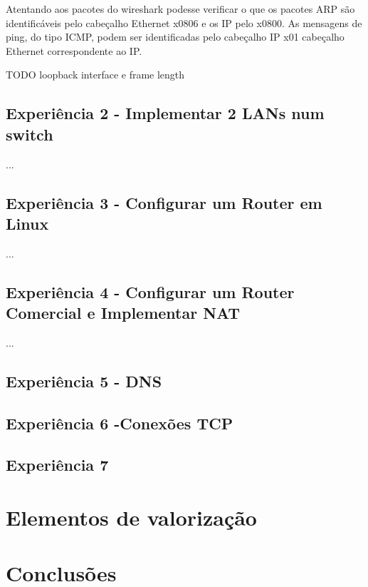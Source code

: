 \documentclass[11pt,a4paper,reqno]{report}
\numberwithin{equation}{section}
\begin{document}
Atentando aos pacotes do wireshark podesse verificar o que os pacotes ARP são identificáveis pelo cabeçalho Ethernet x0806 e os IP pelo x0800. As mensagens de ping, do tipo ICMP, podem ser identificadas pelo cabeçalho IP x01 cabeçalho Ethernet correspondente ao IP.

TODO loopback interface e frame length

\section{Experiência 2 - Implementar 2 LANs num switch}
...
\section{Experiência 3 - Configurar um Router em Linux}
...
\section{Experiência 4 - Configurar um Router Comercial e Implementar NAT}
...
\section{Experiência 5 - DNS}

\section{Experiência 6 -Conexões TCP}

\section{Experiência 7 }

\chapter{Elementos de valorização}


\chapter{Conclusões}


\end{document}
